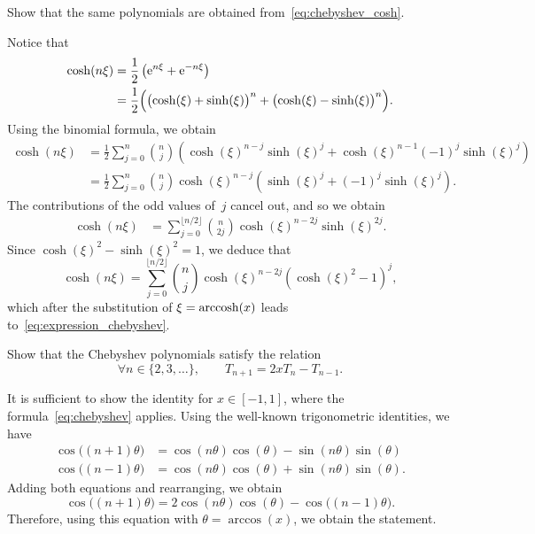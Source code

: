 \begin{exercise}
    Show that the same polynomials are obtained from~\eqref{eq:chebyshev_cosh}.
\end{exercise}
\begin{solution}
    Notice that
    \begin{align*}
        \cosh(n \xi)
        &= \frac{1}{2} \left( \mathrm e^{n \xi} + \mathrm e^{-n \xi} \right) \\
        &= \frac{1}{2} \Bigl( \bigl(\cosh (\xi) + \sinh(\xi)\bigr)^n  + \bigl(\cosh(\xi) - \sinh(\xi)\bigr)^n \Bigr).
    \end{align*}
    Using the binomial formula, we obtain
    \begin{align*}
        \cosh(n \xi)
        &= \frac{1}{2}  \sum_{j=0}^{n} \binom{n}{j} \left( \cosh(\xi)^{n-j} \sinh(\xi)^j + \cosh(\xi)^{n-1} (-1)^j \sinh(\xi)^j \right) \\
        &=  \frac{1}{2} \sum_{j=0}^{n} \binom{n}{j} \cosh(\xi)^{n-j} \left( \sinh(\xi)^j + (-1)^j \sinh(\xi)^j \right).
    \end{align*}
    The contributions of the odd values of~$j$ cancel out,
    and so we obtain
    \begin{align*}
        \cosh(n \xi)
        &=  \sum_{j=0}^{\lfloor n / 2 \rfloor} \binom{n}{2j} \cosh(\xi)^{n-2j} \sinh(\xi)^{2j}.
    \end{align*}
    Since $\cosh(\xi)^2 - \sinh(\xi)^2 = 1$,
    we deduce that
    \[
        \cosh(n \xi)
        =  \sum_{j=0}^{\lfloor n / 2 \rfloor} \binom{n}{j} \cosh(\xi)^{n-2j} (\cosh(\xi)^2 - 1)^{j},
    \]
    which after the substitution of $\xi = \operatorname{arccosh}(x)$ leads to~\eqref{eq:expression_chebyshev}.
\end{solution}

\begin{exercise}
    \label{exercise:recursion_chebyshev}
    Show that the Chebyshev polynomials satisfy the relation
    \[
        \forall n \in \{2, 3, \dotsc\},
        \qquad
        T_{n+1} = 2 x T_{n} - T_{n-1}.
    \]
\end{exercise}
\begin{solution}
    It is sufficient to show the identity for $x \in [-1, 1]$,
    where the formula~\eqref{eq:chebyshev} applies.
    Using the well-known trigonometric identities,
    we have
    \begin{align*}
        \cos\bigl((n+1) \theta\bigr) &= \cos(n \theta) \cos(\theta) - \sin(n \theta) \sin (\theta)  \\
        \cos\bigl((n-1) \theta\bigr) &= \cos(n \theta) \cos(\theta) + \sin(n \theta) \sin (\theta).
    \end{align*}
    Adding both equations and rearranging, we obtain
    \[
        \cos\bigl((n+1) \theta\bigr) = 2 \cos(n \theta) \cos (\theta) - \cos\bigl((n-1) \theta\bigr).
    \]
    Therefore, using this equation with $\theta = \arccos(x)$,
    we obtain the statement.
\end{solution}


